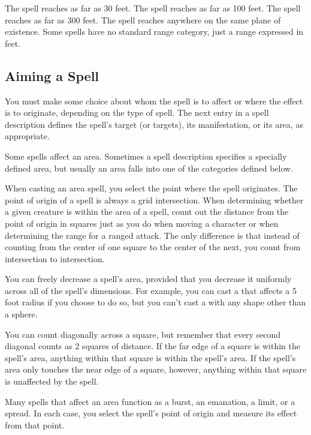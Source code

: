  The spell reaches as far as 30 feet.
 The spell reaches as far as 100 feet.
 The spell reaches as far as 300 feet.
 The spell reaches anywhere on the same plane of existence.
 Some spells have no standard range category, just a range expressed in feet.

\subsection{Aiming a Spell}
You must make some choice about whom the spell is to affect or where the effect is to originate, depending on the type of spell. The next entry in a spell description defines the spell's target (or targets), its manifestation, or its area, as appropriate.

\label{Spell Area} Some spells affect an area. Sometimes a spell description specifies a specially defined area, but usually an area falls into one of the categories defined below.

When casting an area spell, you select the point where the spell originates. The point of origin of a spell is always a grid intersection. When determining whether a given creature is within the area of a spell, count out the distance from the point of origin in squares just as you do when moving a character or when determining the range for a ranged attack. The only difference is that instead of counting from the center of one square to the center of the next, you count from intersection to intersection.

You can freely decrease a spell's area, provided that you decrease it uniformly across all of the spell's dimensions. For example, you can cast a  that affects a 5 foot radius if you choose to do so, but you can't cast a  with any shape other than a sphere.

You can count diagonally across a square, but remember that every second diagonal counts as 2 squares of distance. If the far edge of a square is within the spell's area, anything within that square is within the spell's area. If the spell's area only touches the near edge of a square, however, anything within that square is unaffected by the spell.

 Many spells that affect an area function as a burst, an emanation, a limit, or a spread. In each case, you select the spell's point of origin and measure its effect from that point.


